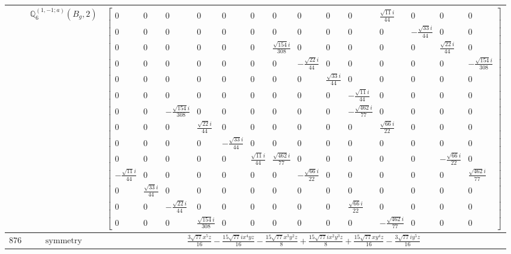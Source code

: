 \documentclass[fleqn,8pt,landscape]{jsarticle}
\begin{document}
\begin{longtable}{ccc}
$  $ & $ \mathbb{Q}_{6}^{(1,-1;a)}(B_{g},2) $ & $ \begin{bmatrix} 0 & 0 & 0 & 0 & 0 & 0 & 0 & 0 & 0 & 0 & \frac{\sqrt{11} i}{44} & 0 & 0 & 0 \\ 0 & 0 & 0 & 0 & 0 & 0 & 0 & 0 & 0 & 0 & 0 & - \frac{\sqrt{33} i}{44} & 0 & 0 \\ 0 & 0 & 0 & 0 & 0 & 0 & \frac{\sqrt{154} i}{308} & 0 & 0 & 0 & 0 & 0 & \frac{\sqrt{22} i}{44} & 0 \\ 0 & 0 & 0 & 0 & 0 & 0 & 0 & - \frac{\sqrt{22} i}{44} & 0 & 0 & 0 & 0 & 0 & - \frac{\sqrt{154} i}{308} \\ 0 & 0 & 0 & 0 & 0 & 0 & 0 & 0 & \frac{\sqrt{33} i}{44} & 0 & 0 & 0 & 0 & 0 \\ 0 & 0 & 0 & 0 & 0 & 0 & 0 & 0 & 0 & - \frac{\sqrt{11} i}{44} & 0 & 0 & 0 & 0 \\ 0 & 0 & - \frac{\sqrt{154} i}{308} & 0 & 0 & 0 & 0 & 0 & 0 & - \frac{\sqrt{462} i}{77} & 0 & 0 & 0 & 0 \\ 0 & 0 & 0 & \frac{\sqrt{22} i}{44} & 0 & 0 & 0 & 0 & 0 & 0 & \frac{\sqrt{66} i}{22} & 0 & 0 & 0 \\ 0 & 0 & 0 & 0 & - \frac{\sqrt{33} i}{44} & 0 & 0 & 0 & 0 & 0 & 0 & 0 & 0 & 0 \\ 0 & 0 & 0 & 0 & 0 & \frac{\sqrt{11} i}{44} & \frac{\sqrt{462} i}{77} & 0 & 0 & 0 & 0 & 0 & - \frac{\sqrt{66} i}{22} & 0 \\ - \frac{\sqrt{11} i}{44} & 0 & 0 & 0 & 0 & 0 & 0 & - \frac{\sqrt{66} i}{22} & 0 & 0 & 0 & 0 & 0 & \frac{\sqrt{462} i}{77} \\ 0 & \frac{\sqrt{33} i}{44} & 0 & 0 & 0 & 0 & 0 & 0 & 0 & 0 & 0 & 0 & 0 & 0 \\ 0 & 0 & - \frac{\sqrt{22} i}{44} & 0 & 0 & 0 & 0 & 0 & 0 & \frac{\sqrt{66} i}{22} & 0 & 0 & 0 & 0 \\ 0 & 0 & 0 & \frac{\sqrt{154} i}{308} & 0 & 0 & 0 & 0 & 0 & 0 & - \frac{\sqrt{462} i}{77} & 0 & 0 & 0 \end{bmatrix} $ \\ \hline
$ 876 $ & $ \text{symmetry} $ & $ \frac{3 \sqrt{77} x^{5} z}{16} - \frac{15 \sqrt{77} i x^{4} y z}{16} - \frac{15 \sqrt{77} x^{3} y^{2} z}{8} + \frac{15 \sqrt{77} i x^{2} y^{3} z}{8} + \frac{15 \sqrt{77} x y^{4} z}{16} - \frac{3 \sqrt{77} i y^{5} z}{16} $ \\

\end{longtable}
\end{document}
